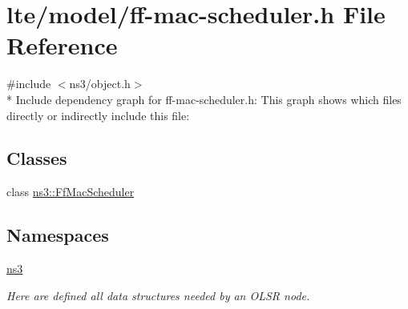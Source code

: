 \hypertarget{ff-mac-scheduler_8h}{}\section{lte/model/ff-\/mac-\/scheduler.h File Reference}
\label{ff-mac-scheduler_8h}
{\ttfamily \#include $<$ns3/object.\+h$>$}\\*
Include dependency graph for ff-\/mac-\/scheduler.h\+:
This graph shows which files directly or indirectly include this file\+:
\subsection*{Classes}
\begin{DoxyCompactItemize}
\item 
class \hyperlink{classns3_1_1FfMacScheduler}{ns3\+::\+Ff\+Mac\+Scheduler}
\end{DoxyCompactItemize}
\subsection*{Namespaces}
\begin{DoxyCompactItemize}
\item 
 \hyperlink{namespacens3}{ns3}
\begin{DoxyCompactList}\small\item\em Here are defined all data structures needed by an O\+L\+SR node. \end{DoxyCompactList}\end{DoxyCompactItemize}
